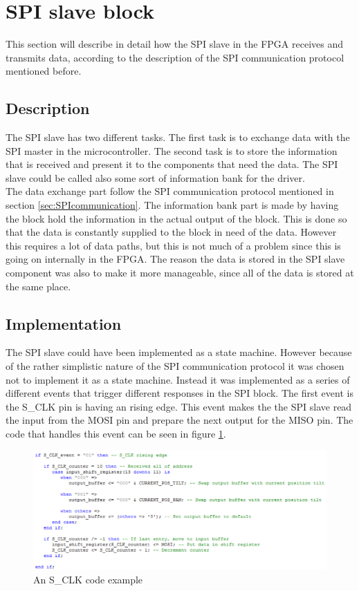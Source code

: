 \section{SPI slave block}
\label{sec:SPIslaveblock}
This section will describe in detail how the SPI slave in the FPGA receives and transmits data, according to the description of the SPI communication protocol mentioned before.

\subsection{Description}

The SPI slave has two different tasks. The first task is to exchange data with the SPI master in the microcontroller. The second task is to store the information that is received and present it to the components that need the data. The SPI slave could be called also some sort of information bank for the driver.\\
The data exchange part follow the SPI communication protocol mentioned in section \ref{sec:SPIcommunication}.
The information bank part is made by having the block hold the information in the actual output of the block. This is done so that the data is constantly supplied to the block in need of the data. However this requires a lot of data paths, but this is not much of a problem since this is going on internally in the FPGA. The reason the data is stored in the SPI slave component was also to make it more manageable, since all of the data is stored at the same place.

\subsection{Implementation}
\label{sec:Implementation}
The SPI slave could have been implemented as a state machine. However because of the rather simplistic nature of the SPI communication protocol it was chosen not to implement it as a state machine. Instead it was implemented as a series of different events that trigger different responses in the SPI block. The first event is the S\_CLK pin is having an rising edge. This event makes the the SPI slave read the input from the MOSI pin and prepare the next output for the MISO pin. The code that handles this event can be seen in figure \ref{fig:S_CLK_code_example}. 

\begin{figure}[h!]
\centering
\includegraphics[scale=0.5]{Billeder/FPGA/SPI_Slave/S_CLK_code_example.png}
\caption{ An S\_CLK code example }
\label{fig:S_CLK_code_example}
\end{figure}

